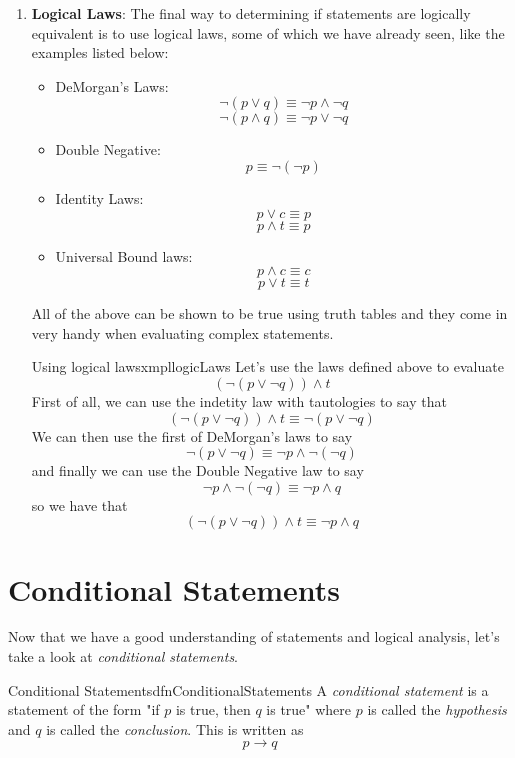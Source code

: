 \begin{enumerate}
\begin{center}
          \end{center}
          This formally proves these two statements are equivalent.
    \item \textbf{Logical Laws}: The final way to determining if statements are logically equivalent is to use logical laws, some of which we have already seen, like the examples listed below:
          \begin{itemize}
              \item DeMorgan's Laws:
                    $$\lnot(p \lor q) \equiv \lnot p \land \lnot q$$
                    $$\lnot(p \land q) \equiv \lnot p \lor \lnot q$$
              \item Double Negative:
                    $$p \equiv \lnot(\lnot p)$$
              \item Identity Laws:
                    $$p \lor c \equiv p$$
                    $$p \land t \equiv p$$
              \item Universal Bound laws:
                    $$p \land c \equiv c$$
                    $$p \lor t \equiv t$$
          \end{itemize}
          All of the above can be shown to be true using truth tables and they come in very handy when evaluating complex statements.
          \begin{exmpl}[label={exmpl:logicLaws}]{Using logical laws}{xmpllogicLaws}
              Let's use the laws defined above to evaluate $$ (\lnot (p \lor \lnot q)) \land t$$
              First of all, we can use the indetity law with tautologies to say that
              $$ (\lnot (p \lor \lnot q)) \land t \equiv  \lnot (p \lor \lnot q)$$
              We can then use the first of DeMorgan's laws to say
              $$\lnot (p \lor \lnot q) \equiv \lnot p \land \lnot (\lnot q)$$
              and finally we can use the Double Negative law to say
              $$ \lnot p \land \lnot (\lnot q) \equiv \lnot p \land q$$
              so we have that
              $$ (\lnot (p \lor \lnot q)) \land t \equiv \lnot p \land q$$
          \end{exmpl}
\end{enumerate}

\section{Conditional Statements}
Now that we have a good understanding of statements and logical analysis, let's take a look at \emph{conditional statements}.

\begin{dfn}[label={def:conditionalStatements}]{Conditional Statements}{dfnConditionalStatements}
    A \emph{conditional statement} is a statement of the form "if $p$ is true, then $q$ is true" where $p$ is called the \emph{hypothesis} and $q$ is called the \emph{conclusion}. This is written as $$p \to q$$
\end{dfn}

